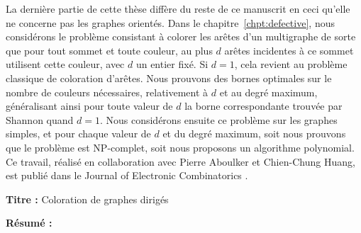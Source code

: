 \bigskip

La dernière partie de cette thèse diffère du reste de ce manuscrit en ceci qu'elle ne concerne pas les graphes orientés. Dans le chapitre~\ref{chpt:defective}, nous considérons le problème consistant à colorer les arêtes d'un multigraphe de sorte que pour tout sommet et toute couleur, au plus $d$ arêtes incidentes à ce sommet utilisent cette couleur, avec $d$ un entier fixé. Si $d = 1$, cela revient au problème classique de coloration d'arêtes. Nous prouvons des bornes optimales sur le nombre de couleurs nécessaires, relativement à $d$ et au degré maximum, généralisant ainsi pour toute valeur de $d$ la borne correspondante trouvée par Shannon \cite{S49} quand $d=1$. Nous considérons ensuite ce problème sur les graphes simples, et pour chaque valeur de $d$ et du degré maximum, soit nous prouvons que le problème est NP-complet, soit nous proposons un algorithme polynomial. Ce travail, réalisé en collaboration avec Pierre Aboulker et Chien-Chung Huang, est publié dans le Journal of Electronic Combinatorics \cite{AAH22}.

\endgroup

\vfill

\thispagestyle{empty}


\noindent\textbf{Titre :} Coloration de graphes dirigés

\vspace{0.5cm}

\noindent\textbf{Résumé :}


